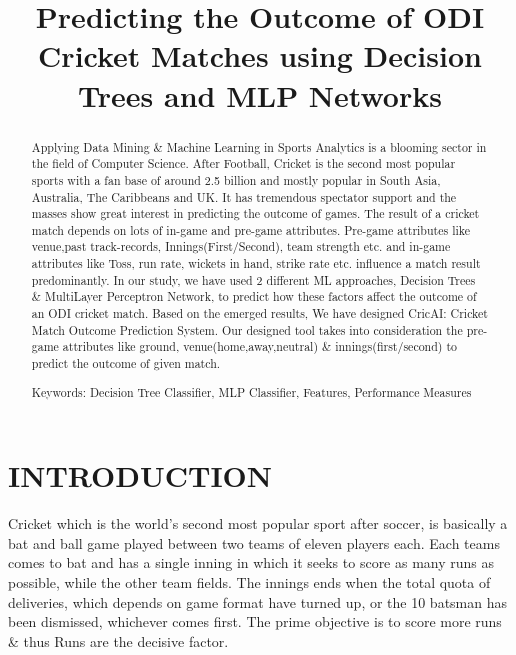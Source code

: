 \documentclass[a4paper, 10pt, conference]{IEEEtran}
\title{Predicting the Outcome of ODI Cricket Matches using Decision Trees and MLP Networks}
\author{
\IEEEauthorblockN{Rajiv Kumar\IEEEauthorrefmark{1},Jalaz Kumar\IEEEauthorrefmark{2}}
\IEEEauthorblockA{
\IEEEauthorrefmark{1}Assistant Professor,\IEEEauthorrefmark{2}Student\\
Department of Computer Science and Engineering\\
National Institute of Technology Hamirpur, India\\
Email: \IEEEauthorrefmark{1}rajiv@nith.ac.in,\IEEEauthorrefmark{2}jalazkumar1208@gmail.com}}
\begin{document}
\maketitle
\thispagestyle{empty}
\pagestyle{empty}


\begin{abstract}

Applying Data Mining \& Machine Learning in Sports Analytics is a blooming sector in the field of Computer Science. After Football, Cricket is the second most popular sports with a fan base of around 2.5 billion and mostly popular in South Asia, Australia, The Caribbeans and UK. It has tremendous spectator support and the masses show great interest in predicting the outcome of games.
The result of a cricket match depends on lots of in-game and pre-game attributes. Pre-game attributes like venue,past track-records, Innings(First/Second), team strength etc. and in-game attributes like Toss, run rate, wickets in hand, strike rate etc. influence a match result predominantly. 
In our study, we have used 2 different ML approaches, Decision Trees \& MultiLayer Perceptron Network, to predict how these factors affect the outcome of an ODI cricket match. Based on the emerged results, We have designed CricAI: Cricket Match Outcome Prediction System. Our designed tool takes into consideration the pre-game attributes like ground,  venue(home,away,neutral) \& innings(first/second) to predict the outcome of given match.


Keywords: Decision Tree Classifier, MLP Classifier, Features, Performance Measures

\end{abstract}


\section{INTRODUCTION}

Cricket which is the world's second most popular sport after soccer, is basically a bat and ball game played between two teams of eleven players each. Each teams comes to bat and has a single inning in which it seeks to score as many runs as possible, while the other team fields. The innings ends when the total quota of deliveries, which depends on game format have turned up, or the 10 batsman has been dismissed, whichever comes first. The prime objective is to score more runs \& thus Runs are the decisive factor.
\end{document}
